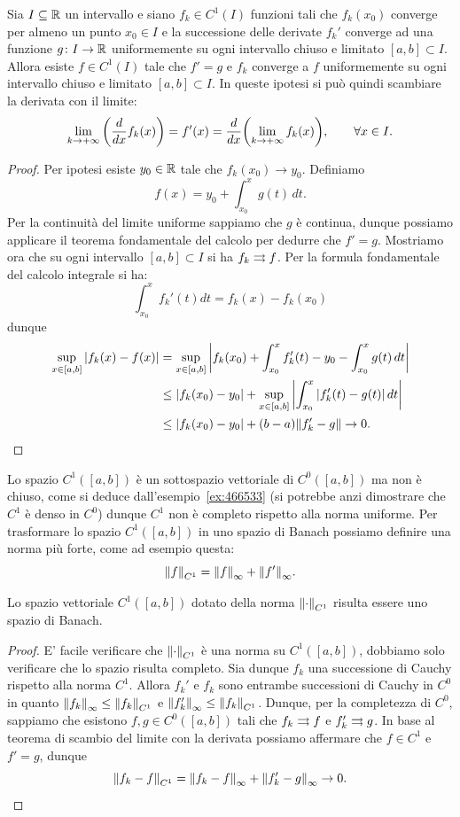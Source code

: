 \begin{theorem}
\mymark{***}
Sia $I\subseteq {\mathbb R}$ un intervallo e siano $f_k\in C^1(I)$ funzioni tali che $f_k(x_0)$ converge per almeno un punto $x_0\in I$ e la successione delle derivate $f_k'$ converge
ad una funzione $g\colon I \to {\mathbb R}$
uniformemente su ogni intervallo chiuso e limitato $[a,b]\subset I$. Allora esiste $f\in C^1(I)$ tale che $f'=g$ e $f_k$ converge a $f$ uniformemente su ogni intervallo chiuso e limitato $[a,b]\subset I$.
In queste ipotesi si può quindi scambiare la derivata con il limite:
\[
  \lim_{k\to +\infty}{\left( \frac{d}{dx} f_k(x) \right)}
  = f'(x)
  = \frac{d}{dx} {\left( \lim_{k\to +\infty} f_k(x) \right)},
  \qquad \forall x \in I.
\]
\end{theorem}
%
\begin{proof}
\mymark{***}
Per ipotesi esiste $y_0\in {\mathbb R}$ tale che $f_k(x_0) \to y_0$.
Definiamo
\[
  f(x) = y_0 + \int_{x_0}^x g(t)\, dt.
\]
Per la continuità del limite uniforme sappiamo che $g$ è continua, dunque possiamo applicare il teorema fondamentale del calcolo per dedurre che $f'=g$. Mostriamo ora che su ogni intervallo $[a,b]\subset I$ si ha $f_k \rightrightarrows f$. Per la formula fondamentale del calcolo integrale si ha:
\[
  \int_{x_0}^x f_k'(t) dt = f_k(x) - f_k(x_0)
\]
dunque
\begin{align*}
  \sup_{x\in [a,b]}{\left|f_k(x) - f(x)\right|}
  &= \sup_{x\in [a,b]} {\left|f_k(x_0) + \int_{x_0}^x f_k'(t) - y_0 - \int_{x_0}^x g(t)\, dt\right|} \\
  &\le {\left|f_k(x_0) - y_0\right|} + \sup_{x\in [a,b]}{\left|\int_{x_0}^x {\left|f_k'(t) - g(t)\right|}\, dt\right|} \\
  &\le {\left|f_k(x_0) - y_0\right|} + (b-a){\left\Vert f_k' - g\right\Vert} \to 0.
\end{align*}
\end{proof}

Lo spazio $C^1([a,b])$ è un sottospazio vettoriale di $C^0([a,b])$ ma non è chiuso, come si deduce dall'esempio~\ref{ex:466533} (si potrebbe anzi dimostrare che $C^1$ è denso in $C^0$) dunque $C^1$ non è completo rispetto alla norma uniforme.
Per trasformare lo spazio $C^1([a,b])$ in uno spazio di Banach
possiamo definire una norma più forte, come ad esempio
questa:
\[
  {\left\Vert f\right\Vert}_{C^1} = {\left\Vert f\right\Vert}_\infty + {\left\Vert f'\right\Vert}_\infty.
\]
\begin{theorem}
\mymark{*}
Lo spazio vettoriale $C^1([a,b])$ dotato della norma ${\left\Vert \cdot\right\Vert}_{C^1}$ risulta essere uno spazio di Banach.
\end{theorem}
%
\begin{proof}
E' facile verificare che ${\left\Vert \cdot\right\Vert}_{C^1}$ è una norma su $C^1([a,b])$, dobbiamo solo verificare che lo spazio risulta completo. Sia dunque $f_k$ una successione di Cauchy rispetto alla norma $C^1$. Allora $f_k'$ e $f_k$ sono entrambe successioni di Cauchy in $C^0$ in quanto ${\left\Vert f_k\right\Vert}_\infty \le {\left\Vert f_k\right\Vert}_{C^1}$ e ${\left\Vert f_k'\right\Vert}_\infty \le {\left\Vert f_k\right\Vert}_{C^1}$.
Dunque, per la completezza di $C^0$, sappiamo che esistono $f,g\in C^0([a,b])$ tali che $f_k\rightrightarrows f$ e $f_k'\rightrightarrows g$.
In base al teorema di scambio del limite con la derivata possiamo affermare che $f\in C^1$ e $f'=g$, dunque
\[
  {\left\Vert f_k-f\right\Vert}_{C^1} = {\left\Vert f_k-f\right\Vert}_\infty + {\left\Vert f_k'-g\right\Vert}_\infty \to 0.
\]
\end{proof}


